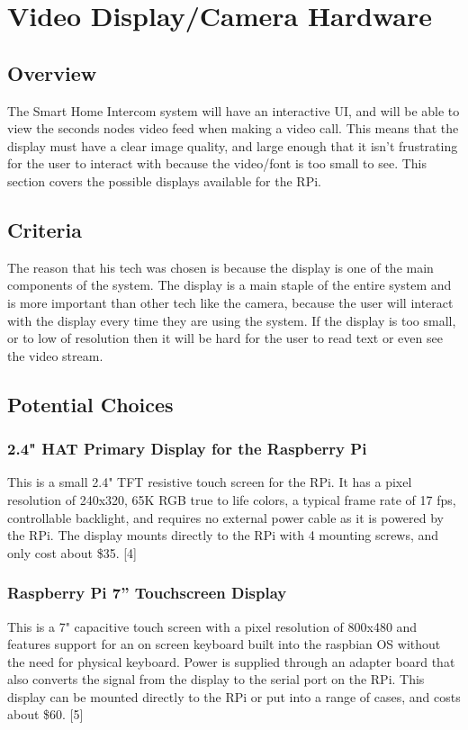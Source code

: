 \documentclass[onecolumn, draftclsnofoot,10pt, compsoc]{IEEEtran}
\begin{document}
\section{Video Display/Camera Hardware}

\subsection{Overview}
 The Smart Home Intercom system will have an interactive UI, and will be able to view the seconds nodes video feed when making a video call. 
 This means that the display must have a clear image quality, and large enough that it isn't frustrating for the user to interact with because the video/font is too small to see. 
 This section covers the possible displays available for the RPi.

\subsection{Criteria}
 The reason that his tech was chosen is because the display is one of the main components of the system. The display is a main staple of the entire system and is more important than other tech like the camera, because the user will interact with the display every time they are using the system. If the display is too small, or to low of resolution then it will be hard for the user to read text or even see the video stream.

\subsection{Potential Choices}


\subsubsection{2.4" HAT Primary Display for the Raspberry Pi}
This is a small 2.4" TFT resistive touch screen for the RPi. It has a pixel resolution of 240x320, 65K RGB true to life colors, a typical frame rate of 17 fps, controllable backlight, and requires no external power cable as it is powered by the RPi. The display mounts directly to the RPi with 4 mounting screws, and only cost about \$35. [4]



\subsubsection{Raspberry Pi 7” Touchscreen Display}
This is a 7" capacitive touch screen with a pixel resolution of 800x480 and features support for an on screen keyboard built into the raspbian OS without the need for physical keyboard. Power is supplied through an adapter board that also converts the signal from the display to the serial port on the RPi. This display can be mounted directly to the RPi or put into a range of cases, and costs about \$60. [5]
\end{document}

